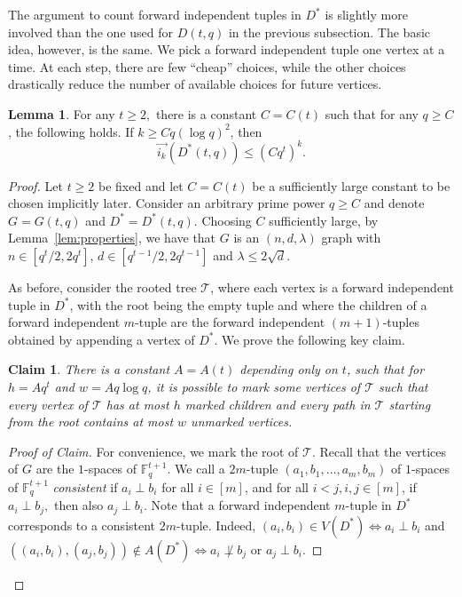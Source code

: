 \documentclass{article}
\theoremstyle{plain}
\newtheorem{claim}[theorem]{Claim}
\newtheorem{lemma}[theorem]{Lemma}
\theoremstyle{definition}
\newtheorem{lemma}{Lemma}
\newcommand{\cT}{\mathcal{T}}
\newcommand{\bF}{\mathbb{F}}
\newcommand{\fwi}[1]{\overrightarrow{i_{#1}}}
\begin{document}
The argument to count forward independent tuples in $D^*$ is slightly more involved than the one used for $D(t, q)$ in the previous subsection. The basic idea, however, is the same. We pick a forward independent tuple one vertex at a time. At each step, there are few ``cheap'' choices, while the other choices drastically reduce the number of available choices for future vertices.

\begin{lemma} \label{lem:fw-ind-sets-s1}
    For any $t \ge 2,$ there is a constant $C = C(t)$ such that for any $q \ge C$, the following holds. If $k \ge C q (\log q)^2$, then
    \[ \fwi{k}(D^*(t, q)) \le (C q^t)^k. \]
\end{lemma}
\begin{proof}
    Let $t \ge 2$ be fixed and let $C = C(t)$ be a sufficiently large constant to be chosen implicitly later. Consider an arbitrary prime power $q \ge C$ and denote $G = G(t, q)$ and $D^* = D^*(t, q)$. Choosing $C$ sufficiently large, by Lemma~\ref{lem:properties}, we have that $G$ is an $(n, d, \lambda)$ graph with $n \in [q^t/2, 2q^t]$, $d \in [q^{t-1}/2, 2q^{t-1}]$ and $\lambda \le 2 \sqrt{d}$.
    
    As before, consider the rooted tree $\cT$, where each vertex is a forward independent tuple in $D^*$, with the root being the empty tuple and where the children of a forward independent $m$-tuple are the forward independent $(m+1)$-tuples obtained by appending a vertex of $D^*$. We prove the following key claim.
    
    \begin{claim}
        There is a constant $A = A(t)$ depending only on $t$, such that for $h = A q^t$ and $w = A q \log q$, it is possible to mark some vertices of $\cT$ such that every vertex of $\cT$ has at most $h$ marked children and every path in $\cT$ starting from the root contains at most $w$ unmarked vertices.
    \end{claim}
    \begin{proof}[Proof of Claim]   
        For convenience, we mark the root of $\cT$. Recall that the vertices of $G$ are the $1$-spaces of $\bF_q^{t+1}$. We call a $2m$-tuple $(a_1, b_1, \dots, a_m, b_m)$ of $1$-spaces of $\bF_q^{t+1}$ \emph{consistent} if $a_i \perp b_i$ for all $i \in [m]$, and for all $i < j, i, j \in [m]$, if $a_i \perp b_j,$ then also $a_j \perp b_i$. Note that a forward independent $m$-tuple in $D^*$ corresponds to a consistent $2m$-tuple. Indeed, $(a_i, b_i) \in V(D^*) \iff a_i \perp b_i$ and $((a_i, b_i), (a_j, b_j)) \not\in A(D^*) \iff a_i \not\perp b_j \text{ or } a_j \perp b_i.$
        

\end{proof}
\end{proof}
\end{document}
